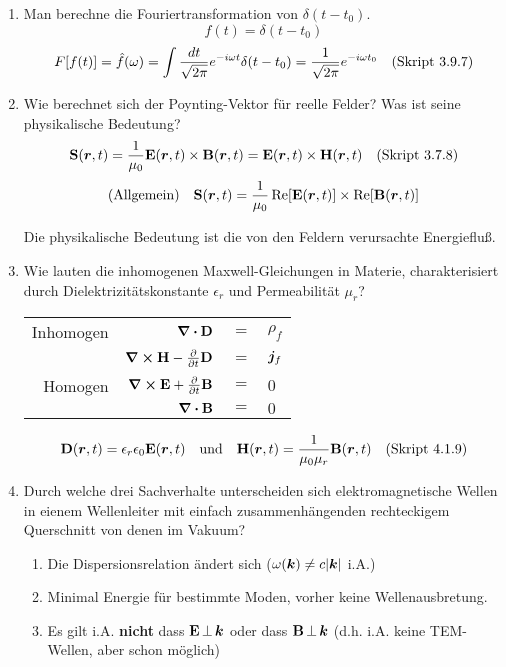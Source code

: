 \begin{enumerate}
  \item Man berechne die Fouriertransformation von $\delta(t-t_0)$. %
        $$f(t)=\delta (t-t_0)$$ 
        $$F[f(t)]=\hat f(\omega)
        =\int\frac{dt}{\sqrt{2\pi}}e^{-i\omega t}\delta(t-t_0)
        =\frac{1}{\sqrt{2\pi}}e^{-i\omega t_0}
        \quad\text{(Skript 3.9.7)}$$ 

  \item Wie berechnet sich der Poynting-Vektor für reelle Felder? Was %
        ist seine physikalische Bedeutung?
        $$\vb S(\vb* r,t)=\frac{1}{\mu_0}\vb E(\vb* r,t)\times\vb B(\vb* r,t)
        =\vb E(\vb* r,t)\times \vb H(\vb* r,t)
        \quad\text{(Skript 3.7.8)}$$
        $$\text{(Allgemein)}\quad\vb S(\vb* r,t)=
        \frac{1}{\mu_0}\Re[\vb E(\vb* r,t)]\times \Re[\vb B(\vb* r,t)]$$
        
        \begin{center}
          Die physikalische Bedeutung ist die von den 
          Feldern verursachte Energiefluß.
        \end{center}

  \clearpage
  \item Wie lauten die inhomogenen Maxwell-Gleichungen in Materie, %
        charakterisiert durch Dielektrizitätskonstante $\epsilon_r$ und
        Permeabilität $\mu_r$?
        \begin{center}
          \begin{tabular}{rrcl}
            Inhomogen&$\div \vb D$ & $=$ &$\rho_f$\\
            &$\curl \vb H-\pdv{t}\vb D$ & $=$ &$\vb* j_f$\\
            Homogen&$\curl \vb E+\pdv{t}\vb B$ & $=$ &$0$\\
            &$\div \vb B$ & $=$ &$0$\\
          \end{tabular}
          $$\vb D(\vb* r,t)=\epsilon_r\epsilon_0\vb E(\vb* r,t) \quad
          \text{und}\quad\vb H(\vb* r, t)=\frac{1}{\mu_0\mu_r}
          \vb B(\vb* r,t)\quad\text{(Skript 4.1.9)}$$
        \end{center}

  \item Durch welche drei Sachverhalte unterscheiden sich %
        elektromagnetische Wellen in eienem Wellenleiter mit einfach
        zusammenhängenden rechteckigem Querschnitt von denen im Vakuum?
        \begin{enumerate}
          \item Die Dispersionsrelation ändert sich 
            ($\omega(\vb* k)\ne c\abs{\vb* k}$ i.A.) 
          \item Minimal Energie für bestimmte Moden, vorher
            keine Wellenausbretung. 
          \item Es gilt i.A. \textbf{nicht} dass $\vb E\,\bot\,\vb* k$
            oder dass $\vb B\,\bot\,\vb* k$ (d.h. i.A. keine TEM-Wellen,
            aber schon möglich) 
        \end{enumerate}


\end{enumerate}
